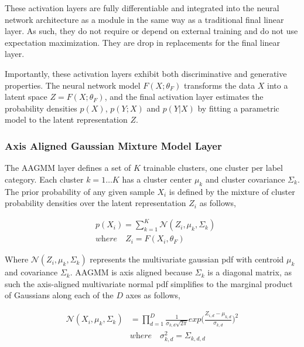 \documentclass[10pt,twocolumn,letterpaper]{article}
\begin{document}
These activation layers are fully differentiable and integrated into the neural network architecture as a module in the same way as a traditional final linear layer. 
As such, they do not require or depend on external training and do not use expectation maximization.
They are drop in replacements for the final linear layer.

Importantly, these activation layers exhibit both discriminative and generative properties. 
The neural network model $F(X;\theta_F)$ transforms the data $X$ into a latent space $Z = F(X;\theta_F)$, and the final activation layer estimates the probability densities $p(X)$, $p(Y;X)$ and $p(Y|X)$ by fitting a parametric model to the latent representation $Z$.

\subsubsection{Axis Aligned Gaussian Mixture Model Layer}

The AAGMM layer defines a set of $K$ trainable clusters, one cluster per label category. 
Each cluster $k=1 \dots K$ has a cluster center $\mu_k$ and cluster covariance $\Sigma_k$. 
The prior probability of any given sample $X_i$ is defined by the mixture of cluster probability densities over the latent representation $Z_i$ as follows,

\begin{equation}
	\begin{aligned}
		\label{eq_px}
		&p(X_i) = \sum_{k=1}^K \mathcal{N} (Z_i, \mu_{k}, \Sigma_k)
		\\[10pt]
		&\textit{where} \quad Z_i = F(X_i, \theta_F)
	\end{aligned}
\end{equation}

Where $\mathcal{N}(Z_i, \mu_k, \Sigma_k)$ represents the multivariate gaussian pdf with centroid $\mu_k$ and covariance $\Sigma_k$. 
AAGMM is axis aligned because $\Sigma_k$ is a diagonal matrix, as such the axis-aligned multivariate normal pdf simplifies to the marginal product of Gaussians along each of the $D$ axes as follows,

\begin{equation}
	\begin{aligned}
		\mathcal{N} (X_i, \mu_{k}, \Sigma_k) &=  \prod_{d=1}^D \frac{1}{\sigma_{k,d}\sqrt{2 \pi}} exp \Big( \frac{Z_{i,d} - \mu_{k,d}} {\sigma_{k,d}} \Big)^2 \\[10pt]
		&\textit{where} \quad \sigma^2_{k,d} = \Sigma_{k,d,d}
	\end{aligned}
\end{equation}
\end{document}
